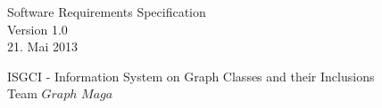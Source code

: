 \documentclass[11pt,a4paper]{article}
\begin{document}
\thispagestyle{empty} %
\vspace*{5cm} 
\begin{center}
{\huge Software Requirements Specification}\\
{\large Version 1.0}\\
{\large 21. Mai 2013}\\
\end{center}

\begin{center}
{\large ISGCI - Information System on Graph Classes and their Inclusions}\\
{\large Team $Graph$ $Maga$}
\end{center}




 
 
 
 \newpage
 
 \renewcommand{\contentsname}{Inhaltsverzeichnis}
 \tableofcontents %
 
 \newpage
 
 
 
 
\end{document}
